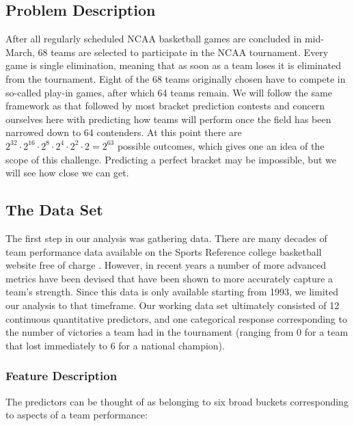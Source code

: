 \documentclass[10pt,a4paper, hidelinks]{article} %
\begin{document}
\subsection{Problem Description}
After all regularly scheduled NCAA basketball games are concluded in mid-March, 68 teams are selected to participate in the NCAA tournament. Every game is single elimination, meaning that as soon as a team loses it is eliminated from the tournament. Eight of the 68 teams originally chosen have to compete in so-called play-in games, after which 64 teams remain. We will follow the same framework as that followed by most bracket prediction contests and concern ourselves here with predicting how teams will perform once the field has been narrowed down to 64 contenders. At this point there are $2^{32} \cdot 2^{16} \cdot 2^8 \cdot 2^4 \cdot 2^2 \cdot 2 = 2^{63}$ possible outcomes, which gives one an idea of the scope of this challenge. Predicting a perfect bracket may be impossible, but we will see how close we can get.

\subsection{The Data Set}

The first step in our analysis was gathering data. There are many decades of team performance data available on the Sports Reference college basketball website free of charge \cite{bballsite}. However, in recent years a number of more advanced metrics have been devised that have been shown to more accurately capture a team's strength. Since this data is only available starting from 1993, we limited our analysis to that timeframe. Our working data set ultimately consisted of 12 continuous quantitative predictors, and one categorical response corresponding to the number of victories a team had in the tournament (ranging from 0 for a team that lost immediately to 6 for a national champion).

\subsubsection{Feature Description}

The predictors can be thought of as belonging to six broad buckets corresponding to aspects of a team performance:
\end{document}
